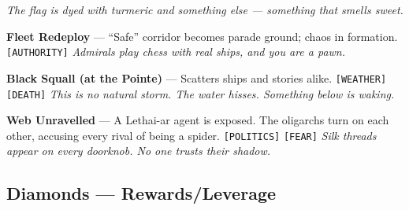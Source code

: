 \begin{enumerate}[label={[\Alph*]}]
  \hfill \textit{The flag is dyed with turmeric and something else --- something that smells sweet.}
\item \textbf{Fleet Redeploy} --- ``Safe'' corridor becomes parade ground; chaos in formation. \texttt{[AUTHORITY]}
  \hfill \textit{Admirals play chess with real ships, and you are a pawn.}
\item \textbf{Black Squall (at the Pointe)} --- Scatters ships and stories alike. \texttt{[WEATHER]} \texttt{[DEATH]}
  \hfill \textit{This is no natural storm. The water hisses. Something below is waking.}
\item \textbf{Web Unravelled} --- A Lethai-ar agent is exposed. The oligarchs turn on each other, accusing every rival of being a spider. \texttt{[POLITICS]} \texttt{[FEAR]} \hfill \textit{Silk threads appear on every doorknob. No one trusts their shadow.}
\end{enumerate}

\subsection*{Diamonds --- Rewards/Leverage}
\label{sec:kahfagia-rewards}

